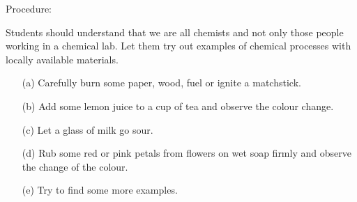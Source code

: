 \begin{multicols}{2}
\begin{description*}
\item[Procedure:]{Students should understand that we are all
chemists and not only those people working in
a chemical lab. Let them try out examples of
chemical processes with locally available
materials.
\begin{itemize}
\item[(a)] Carefully burn some paper, wood, fuel or
ignite a matchstick.
\item[(b)] Add some lemon juice to a cup of tea and
observe the colour change.
\item[(c)] Let a glass of milk go sour.
\item[(d)] Rub some red or pink petals from flowers on
wet soap firmly and observe the change of the
colour.
\item[(e)] Try to find some more examples.
\end{itemize}
}
\end{description*}



\end{multicols}

\pagebreak